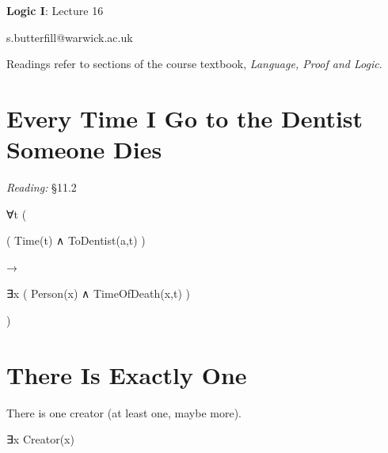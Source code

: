 \documentclass[12pt]{extarticle}
\date{}
\makeatletter
\def \ititle {Origins of Mind}
\def \isubtitle {Lecture 08}
\def \iemail{s.butterfill@warwick.ac.uk}
\makeatother
\begin{document}

\begin{multicols*}{3}

\setlength\footnotesep{1em}







\def \ititle {Logic I}
 
\def \isubtitle {Lecture 16}
 
\begin{center}
 
{\Large
 
\textbf{\ititle}: \isubtitle
 
}
 
 
 
\iemail %
 
\end{center}
 
Readings refer to sections of the course textbook, \emph{Language, Proof and Logic}.
 
 
 
\section{Every Time I Go to the Dentist Someone Dies}
 
\emph{Reading:} §11.2
 
∀t (
 
\hspace{5mm} ( Time(t) ∧ ToDentist(a,t) )
 
\hspace{5mm} →
 
\hspace{5mm} ∃x ( Person(x) ∧ TimeOfDeath(x,t) )
 
)
 
 
 
\section{There Is Exactly One}
 
There is one creator (at least one, maybe more).
 
\hspace{3mm} ∃x Creator(x)
 

\end{multicols*}
\end{document}
